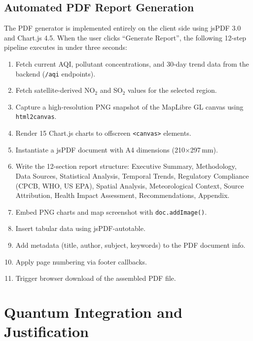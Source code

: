 \documentclass[12pt,a4paper]{article}
\begin{document}
\subsection{Automated PDF Report Generation}
\label{sec:impl:pdf}

The PDF generator is implemented entirely on the client side using jsPDF 3.0
and Chart.js 4.5. When the user clicks ``Generate Report'', the following
12-step pipeline executes in under three seconds:

\begin{enumerate}[leftmargin=*]
\item Fetch current AQI, pollutant concentrations, and 30-day trend data from
      the backend (\texttt{/aqi} endpoints).
\item Fetch satellite-derived NO$_2$ and SO$_2$ values for the selected region.
\item Capture a high-resolution PNG snapshot of the MapLibre GL canvas using
      \texttt{html2canvas}.
\item Render 15 Chart.js charts to offscreen \texttt{<canvas>} elements.
\item Instantiate a jsPDF document with A4 dimensions (210$\times$297\,mm).
\item Write the 12-section report structure: Executive Summary, Methodology,
      Data Sources, Statistical Analysis, Temporal Trends, Regulatory
      Compliance (CPCB, WHO, US EPA), Spatial Analysis, Meteorological Context,
      Source Attribution, Health Impact Assessment, Recommendations, Appendix.
\item Embed PNG charts and map screenshot with \texttt{doc.addImage()}.
\item Insert tabular data using jsPDF-autotable.
\item Add metadata (title, author, subject, keywords) to the PDF document info.
\item Apply page numbering via footer callbacks.
\item Trigger browser download of the assembled PDF file.
\end{enumerate}

\clearpage
\section{Quantum Integration and Justification}
\label{sec:quantum}
\end{document}
